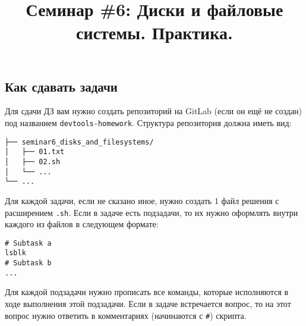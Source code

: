 \documentclass{article}
\begin{document}
\title{Семинар \#6: Диски и файловые системы. Практика. \vspace{-5ex}}\date{}\maketitle
\subsection*{Как сдавать задачи}
Для сдачи ДЗ вам нужно создать репозиторий на GitLab (если он ещё не создан) под названием \texttt{devtools-homework}. Структура репозитория должна иметь вид:
\begin{center}
\begin{BVerbatim}
├── seminar6_disks_and_filesystems/
│   ├── 01.txt
│   ├── 02.sh
│   └── ...
└── ...
\end{BVerbatim}
\end{center}
Для каждой задачи, если не сказано иное, нужно создать 1 файл решения с расширением \texttt{.sh}. Если в задаче есть подзадачи, то их нужно оформлять внутри каждого из файлов в следующем формате:
\begin{lstlisting}
# Subtask a
lsblk
# Subtask b
...
\end{lstlisting}
Для каждой подзадачи нужно прописать все команды, которые исполняются в ходе выполнения этой подзадачи. Если в задаче встречается вопрос, то на этот вопрос нужно ответить в комментариях (начинаются с \texttt{\#}) скрипта.
\end{document}

